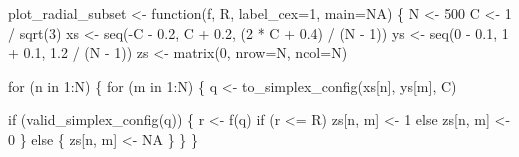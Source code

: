 \documentclass[
  letterpaper,
  DIV=11,
  numbers=noendperiod]{scrartcl}
\newenvironment{Shaded}{\begin{snugshade}}{\end{snugshade}}
\newcommand{\AttributeTok}[1]{\textcolor[rgb]{0.40,0.45,0.13}{#1}}
\newcommand{\ConstantTok}[1]{\textcolor[rgb]{0.56,0.35,0.01}{#1}}
\newcommand{\ControlFlowTok}[1]{\textcolor[rgb]{0.00,0.23,0.31}{#1}}
\newcommand{\DecValTok}[1]{\textcolor[rgb]{0.68,0.00,0.00}{#1}}
\newcommand{\FloatTok}[1]{\textcolor[rgb]{0.68,0.00,0.00}{#1}}
\newcommand{\FunctionTok}[1]{\textcolor[rgb]{0.28,0.35,0.67}{#1}}
\newcommand{\NormalTok}[1]{\textcolor[rgb]{0.00,0.23,0.31}{#1}}
\newcommand{\OtherTok}[1]{\textcolor[rgb]{0.00,0.23,0.31}{#1}}
\newcommand{\SpecialCharTok}[1]{\textcolor[rgb]{0.37,0.37,0.37}{#1}}
\begin{document}
\begin{Shaded}
\begin{Highlighting}[]
\NormalTok{plot\_radial\_subset }\OtherTok{\textless{}{-}} \ControlFlowTok{function}\NormalTok{(f, R, }\AttributeTok{label\_cex=}\DecValTok{1}\NormalTok{, }\AttributeTok{main=}\ConstantTok{NA}\NormalTok{) \{}
\NormalTok{  N }\OtherTok{\textless{}{-}} \DecValTok{500}
\NormalTok{  C }\OtherTok{\textless{}{-}} \DecValTok{1} \SpecialCharTok{/} \FunctionTok{sqrt}\NormalTok{(}\DecValTok{3}\NormalTok{)}
\NormalTok{  xs }\OtherTok{\textless{}{-}} \FunctionTok{seq}\NormalTok{(}\SpecialCharTok{{-}}\NormalTok{C }\SpecialCharTok{{-}} \FloatTok{0.2}\NormalTok{, C }\SpecialCharTok{+} \FloatTok{0.2}\NormalTok{, (}\DecValTok{2} \SpecialCharTok{*}\NormalTok{ C }\SpecialCharTok{+} \FloatTok{0.4}\NormalTok{) }\SpecialCharTok{/}\NormalTok{ (N }\SpecialCharTok{{-}} \DecValTok{1}\NormalTok{))}
\NormalTok{  ys }\OtherTok{\textless{}{-}} \FunctionTok{seq}\NormalTok{(}\DecValTok{0} \SpecialCharTok{{-}} \FloatTok{0.1}\NormalTok{, }\DecValTok{1} \SpecialCharTok{+} \FloatTok{0.1}\NormalTok{, }\FloatTok{1.2} \SpecialCharTok{/}\NormalTok{ (N }\SpecialCharTok{{-}} \DecValTok{1}\NormalTok{))}
\NormalTok{  zs }\OtherTok{\textless{}{-}} \FunctionTok{matrix}\NormalTok{(}\DecValTok{0}\NormalTok{, }\AttributeTok{nrow=}\NormalTok{N, }\AttributeTok{ncol=}\NormalTok{N)}

  \ControlFlowTok{for}\NormalTok{ (n }\ControlFlowTok{in} \DecValTok{1}\SpecialCharTok{:}\NormalTok{N) \{}
    \ControlFlowTok{for}\NormalTok{ (m }\ControlFlowTok{in} \DecValTok{1}\SpecialCharTok{:}\NormalTok{N) \{}
\NormalTok{      q }\OtherTok{\textless{}{-}} \FunctionTok{to\_simplex\_config}\NormalTok{(xs[n], ys[m], C)}

      \ControlFlowTok{if}\NormalTok{ (}\FunctionTok{valid\_simplex\_config}\NormalTok{(q)) \{}
\NormalTok{        r }\OtherTok{\textless{}{-}} \FunctionTok{f}\NormalTok{(q)}
        \ControlFlowTok{if}\NormalTok{ (r }\SpecialCharTok{\textless{}=}\NormalTok{ R)}
\NormalTok{          zs[n, m] }\OtherTok{\textless{}{-}} \DecValTok{1}
        \ControlFlowTok{else}
\NormalTok{          zs[n, m] }\OtherTok{\textless{}{-}} \DecValTok{0}
\NormalTok{      \} }\ControlFlowTok{else}\NormalTok{ \{}
\NormalTok{        zs[n, m] }\OtherTok{\textless{}{-}} \ConstantTok{NA}
\NormalTok{      \}}
\NormalTok{    \}}
\NormalTok{  \}}


\end{Highlighting}
\end{Shaded}
\end{document}
